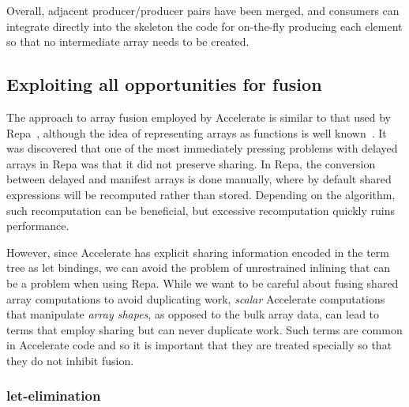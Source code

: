 Overall, adjacent producer/producer pairs have been merged, and consumers can
integrate directly into the skeleton the code for on-the-fly producing each
element so that no intermediate array needs to be created.

\fusion[consumer|)]{}

\subsection{Exploiting all opportunities for fusion}
\label{sec:binder_elimination}

The approach to array fusion employed by Accelerate is similar to that used by
Repa~\cite{Keller:2010er,Lippmeier:2011cd,Lippmeier:2012gx}, although the idea
of representing arrays as functions is well known~\cite{Guibas:1978jh,Elliott:2003ug}. It was discovered that one of
the most immediately pressing problems with delayed arrays in Repa was that it
did not preserve sharing. In Repa, the conversion between delayed and manifest
arrays is done manually, where by default shared expressions will be recomputed
rather than stored. Depending on the algorithm, such recomputation can be
beneficial, but excessive recomputation quickly ruins performance.

However, since Accelerate has explicit sharing information encoded in the term
tree as let bindings, we can avoid the problem of unrestrained inlining that can
be a problem when using Repa. While we want to be careful about fusing
shared array computations to avoid duplicating work, \emph{scalar} Accelerate
computations that manipulate \emph{array shapes}, as opposed to the bulk array
data, can lead to terms that employ sharing but can never duplicate work. Such
terms are common in Accelerate code and so it is important that they are treated
specially so that they do not inhibit fusion.


\subsubsection{let-elimination}

